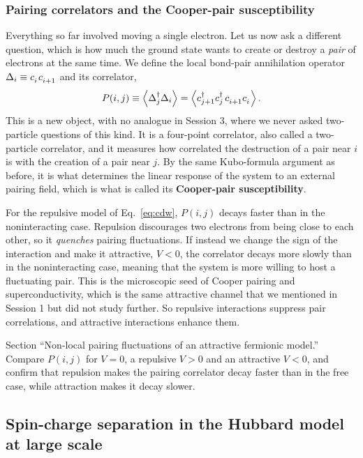 \documentclass[lecture_notes.tex]{subfiles}
\begin{document}
\subsubsection{Pairing correlators and the Cooper-pair susceptibility}
Everything so far involved moving a single electron. Let us now ask a different question, which is
how much the ground state wants to create or destroy a \emph{pair} of electrons at the same time.
We define the local bond-pair annihilation operator $\Delta_i \equiv \ann{i}\ann{i+1}$ and its
correlator,
\begin{equation}
  P(i,j) \equiv \expval{\Delta_j^{\dagger}\Delta_i}
    = \expval{\cre{j+1}\cre{j}\,\ann{i+1}\ann{i}}.
\end{equation}
This is a new object, with no analogue in Session 3, where we never asked two-particle questions of
this kind. It is a four-point correlator, also called a two-particle correlator, and it measures how
correlated the destruction of a pair near $i$ is with the creation of a pair near $j$. By the same
Kubo-formula argument as before, it is what determines the linear response of the system to
an external pairing field, which is what is called its \textbf{Cooper-pair susceptibility}.

For the repulsive model of Eq.~\eqref{eq:cdw}, $P(i,j)$ decays faster than in the noninteracting
case. Repulsion discourages two electrons from being close to each other, so it \emph{quenches}
pairing fluctuations. If instead we change the sign of the interaction and make it attractive,
$V<0$, the correlator decays more slowly than in the noninteracting case, meaning that the system is
more willing to host a fluctuating pair. This is the microscopic seed of Cooper pairing and
superconductivity, which is the same attractive channel that we mentioned in Session 1 but did not
study further. So repulsive interactions suppress pair correlations, and attractive interactions
enhance them.

\begin{notebook}
Section ``Non-local pairing fluctuations of an attractive fermionic model.'' Compare $P(i,j)$ for
$V=0$, a repulsive $V>0$ and an attractive $V<0$, and confirm that repulsion makes the pairing
correlator decay faster than in the free case, while attraction makes it decay slower.
\end{notebook}

\subsection{Spin-charge separation in the Hubbard model at large scale}
\label{sec:hubbard}
\end{document}
